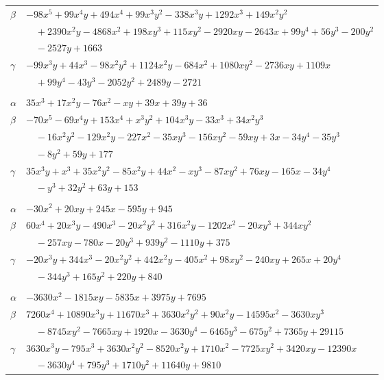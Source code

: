 \documentclass[11pt]{article}
\begin{document}
\begin{longtable}{@{}ll@{}}
$\beta$ & $-98x^{5}+99x^{4}y+494x^{4}+99x^{3}y^{2}-338x^{3}y+1292x^{3}+149x^{2}y^{2}$\\
 & $\quad +2390x^{2}y-4868x^{2}+198xy^{3}+115xy^{2}-2920xy-2643x+99y^{4}+56y^{3}-200y^{2}$\\
 & $\quad -2527y+1663$\\
$\gamma$ & $-99x^{3}y+44x^{3}-98x^{2}y^{2}+1124x^{2}y-684x^{2}+1080xy^{2}-2736xy+1109x$\\
 & $\quad +99y^{4}-43y^{3}-2052y^{2}+2489y-2721$\\
\addlinespace[3pt]
\multicolumn{2}{@{}l}{$\{i,j\}=\{10,109\}$, $k_{ij}=2^{2}\cdot 3^{3}$}\\
$\alpha$ & $35x^{3}+17x^{2}y-76x^{2}-xy+39x+39y+36$\\
$\beta$ & $-70x^{5}-69x^{4}y+153x^{4}+x^{3}y^{2}+104x^{3}y-33x^{3}+34x^{2}y^{3}$\\
 & $\quad -16x^{2}y^{2}-129x^{2}y-227x^{2}-35xy^{3}-156xy^{2}-59xy+3x-34y^{4}-35y^{3}$\\
 & $\quad -8y^{2}+59y+177$\\
$\gamma$ & $35x^{3}y+x^{3}+35x^{2}y^{2}-85x^{2}y+44x^{2}-xy^{3}-87xy^{2}+76xy-165x-34y^{4}$\\
 & $\quad -y^{3}+32y^{2}+63y+153$\\
\addlinespace[3pt]
\multicolumn{2}{@{}l}{$\{i,j\}=\{10,110\}$, $k_{ij}=3^{4}\cdot 5\cdot 7$}\\
$\alpha$ & $-30x^{2}+20xy+245x-595y+945$\\
$\beta$ & $60x^{4}+20x^{3}y-490x^{3}-20x^{2}y^{2}+316x^{2}y-1202x^{2}-20xy^{3}+344xy^{2}$\\
 & $\quad -257xy-780x-20y^{3}+939y^{2}-1110y+375$\\
$\gamma$ & $-20x^{3}y+344x^{3}-20x^{2}y^{2}+442x^{2}y-405x^{2}+98xy^{2}-240xy+265x+20y^{4}$\\
 & $\quad -344y^{3}+165y^{2}+220y+840$\\
\addlinespace[3pt]
\multicolumn{2}{@{}l}{$\{i,j\}=\{10,113\}$, $k_{ij}=3^{5}\cdot 5\cdot 19$}\\
$\alpha$ & $-3630x^{2}-1815xy-5835x+3975y+7695$\\
$\beta$ & $7260x^{4}+10890x^{3}y+11670x^{3}+3630x^{2}y^{2}+90x^{2}y-14595x^{2}-3630xy^{3}$\\
 & $\quad -8745xy^{2}-7665xy+1920x-3630y^{4}-6465y^{3}-675y^{2}+7365y+29115$\\
$\gamma$ & $3630x^{3}y-795x^{3}+3630x^{2}y^{2}-8520x^{2}y+1710x^{2}-7725xy^{2}+3420xy-12390x$\\
 & $\quad -3630y^{4}+795y^{3}+1710y^{2}+11640y+9810$\\

\end{longtable}
\end{document}
